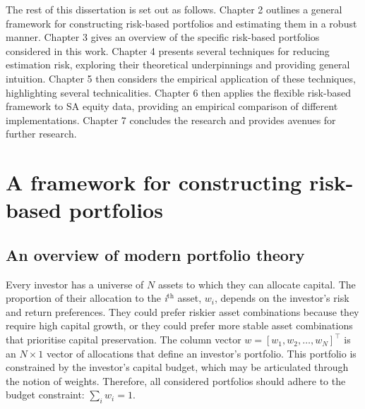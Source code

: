 \documentclass[
]{article}
\begin{document}
The rest of this dissertation is set out as follows. Chapter 2 outlines a general framework for
constructing risk-based portfolios and estimating them in a robust manner. Chapter 3 gives an
overview of the specific risk-based portfolios considered in this work. Chapter 4 presents several
techniques for reducing estimation risk, exploring their theoretical underpinnings and providing
general intuition. Chapter 5 then considers the empirical application of these techniques,
highlighting several technicalities. Chapter 6 then applies the flexible risk-based framework to SA
equity data, providing an empirical comparison of different implementations. Chapter 7 concludes the
research and provides avenues for further research.

\hypertarget{genframework}{%
\section{A framework for constructing risk-based portfolios}\label{genframework}}

\hypertarget{mpt}{%
\subsection{An overview of modern portfolio theory}\label{mpt}}

Every investor has a universe of \(N\) assets to which they can allocate capital. The proportion of
their allocation to the \emph{i}\(^{\text{th}}\) asset, \(w_i\), depends on the investor's risk and return
preferences. They could prefer riskier asset combinations because they require high capital growth,
or they could prefer more stable asset combinations that prioritise capital preservation. The column
vector \(w = [w_1,w_2,…,w_N]^\intercal\) is an \(N \times 1\) vector of allocations that define an
investor's portfolio. This portfolio is constrained by the investor's capital budget, which may be
articulated through the notion of weights. Therefore, all considered portfolios should adhere to the
budget constraint: \(\sum_i w_i = 1\).
\end{document}
